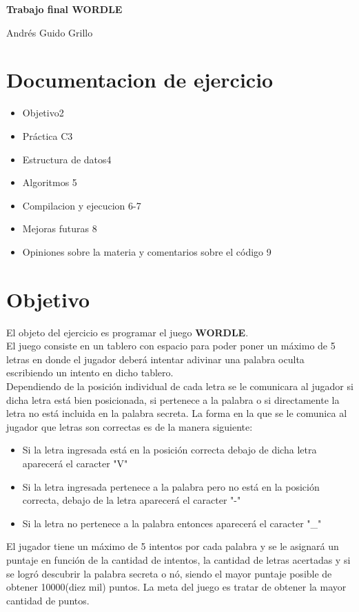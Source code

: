 \documentclass[oneside]{article}
\begin{document}
	\begin{titlepage}
		\vspace*{\fill}		
		\centering
		{\huge \bfseries Trabajo final WORDLE\par}
		\vspace{1cm}
		{\large Andrés Guido Grillo\par}		
		\vfill
	\end{titlepage}
	
	\section*{Documentacion de ejercicio}
	\begin{itemize}
		\item Objetivo\hfill 2
		\item Práctica C\hfill 3
		\item Estructura de datos\hfill 4
		\item Algoritmos \hfill 5
		\item Compilacion y ejecucion \hfill 6-7
		\item Mejoras futuras \hfill 8
		\item Opiniones sobre la materia y comentarios sobre el código \hfill 9
	\end{itemize}

	\newpage
	\thispagestyle{fancy}	

	\section*{Objetivo}
	El objeto del ejercicio es programar el juego \textbf{WORDLE}.\\
	El juego consiste en un tablero con espacio para poder poner un máximo de 5 letras en donde el jugador deberá intentar adivinar una palabra oculta escribiendo un intento en dicho tablero.\\
	Dependiendo de la posición individual de cada letra se le comunicara al jugador si dicha letra está bien posicionada, si pertenece a la palabra o si directamente la letra no está incluida en la palabra secreta. La forma en la que se le comunica al jugador que letras son correctas es de la manera siguiente:
	\begin{itemize}
	\item Si la letra ingresada está en la posición correcta debajo de dicha letra aparecerá el caracter "V"
	\item Si la letra ingresada pertenece a la palabra pero no está en la posición correcta, debajo de la letra aparecerá el caracter "-"
	\item Si la letra no pertenece a la palabra entonces aparecerá el caracter "\_"
	\end{itemize}
	El jugador tiene un máximo de 5 intentos por cada palabra y se le asignará un puntaje en función de la cantidad de intentos, la cantidad de letras acertadas y si se logró descubrir la palabra secreta o nó, siendo el mayor puntaje posible de obtener 10000(diez mil) puntos. La meta del juego es tratar de obtener la mayor cantidad de puntos.
	
\end{document}
